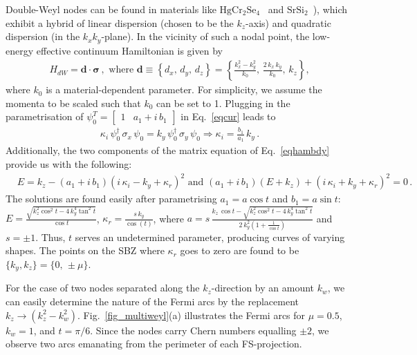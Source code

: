 \documentclass[aps,prb,onecolumn, footinbib, 10pt]{revtex4-2}
\begin{document}
Double-Weyl nodes can be found in materials like $\mathrm{HgCr_2Se_4}$~\cite{Gang2011} and $\mathrm{SrSi_2}$~\cite{hasan_mweyl16, singh18_tunable}), which exhibit a hybrid of linear dispersion (chosen to be the $k_z$-axis) and quadratic dispersion (in the $k_x k_y$-plane). In the vicinity of such a nodal point, the low-energy effective continuum Hamiltonian is given by \cite{bernevig,bernevig2, fu22_thermoelectric, ips_rahul_ph_strain, ips-ruiz, ips-tilted, chen16_thermoelectric}
\begin{align}
\label{eqhamdw}
H_{dW} = \boldsymbol{d} \cdot \boldsymbol{\sigma}  \,, \text{ where }
\boldsymbol{d} \equiv \left\{ d_x,\, d_y, \, d_z \right\} = \left\{
\frac{k_x^2-k_y^2} {k_0} , \, \frac{2 \,k_x \,k_y} {k_0} ,\, k_z\right\} ,
\end{align}
where $k_0$ is a material-dependent parameter. For simplicity, we assume the momenta to be scaled such that $k_0$ can be set to 1.
Plugging in the parametrisation of $ \psi_0^T  = \begin{bmatrix}
1 & a_1 +i \, b_1 \end{bmatrix}$ in Eq.~\eqref{eqcur} leads to
\begin{align}
\label{eq29}
\kappa_i \,\psi_0^\dagger\, \sigma_x \, \psi_0 
=k_y \, \psi_0^\dagger\, \sigma_y \, \psi_0 \Rightarrow
 \kappa_i = \frac{b_1}{a_1} \,k_y \,.
\end{align}
Additionally, the two components of the matrix equation of Eq.~\eqref{eqhambdy} provide us with the following:
\begin{align}
&  E = k_z- \left(a_1+i\, b_1\right) \left(i \,\kappa _i-k_y+\kappa _r \right)^2
 \text{ and }
\left(a_1+i \,b_1\right) \left( E + k_z\right)+\left(i \,\kappa _i+k_y+\kappa _r\right)^2 = 0 \,.
\end{align}
The solutions are found easily after parametrising $ a_1 = a \cos t$ and $ b_1 = a \sin t$:
$E = \frac{\sqrt{k_z^2 \cos^2  t-4 \,k_y^4 \tan ^2 t }}
{\cos t}$, $ \kappa _r =  \frac{ s \, k_y}{\cos (t)} $, where
$a = s \, \frac{ k_z \,\cos t-\sqrt{k_z^2 \cos ^2 t-4 \,k_y^4 \tan^2 t} }
{2\, k_y^2 \left( 1 + \frac{1}{\cos t} \right)}$ and $s = \pm 1$.
Thus, $t$ serves an undetermined parameter, producing curves of varying shapes. The points on the SBZ where $\kappa_r$ goes to zero are found to be $\lbrace k_y, k_z \rbrace = \lbrace  0,\, \pm \mu \rbrace $.

For the case of two nodes separated along the $ k_z$-direction by an amount $k_w$, we can easily determine the nature of the Fermi arcs by the replacement $ k_z \rightarrow (k_z^2 - k_w^2)$. Fig.~\ref{fig_multiweyl}(a) illustrates the Fermi arcs for $\mu=0.5$, $k_w =1$, and $ t = \pi/6 $. Since the nodes carry Chern numbers equalling $\pm 2$, we observe two arcs emanating from the perimeter of each FS-projection.
\end{document}
